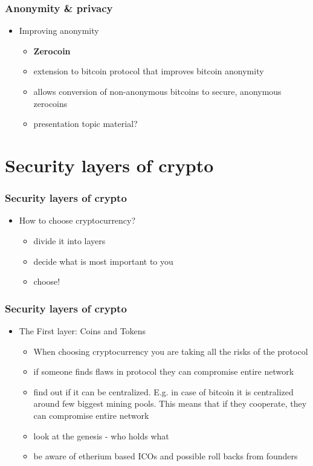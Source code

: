 \documentclass{beamer}
\begin{document}
\begin{frame}
    \frametitle{Anonymity \& privacy}
    \begin{itemize}
        \item<1-> Improving anonymity
        \begin{itemize}
            \item<2-> \textbf{Zerocoin}
            \item<3-> extension to bitcoin protocol that improves bitcoin anonymity
            \item<4-> allows conversion of non-anonymous bitcoins to secure, anonymous zerocoins
            \item<5-> presentation topic material?
        \end{itemize}   
    \end{itemize}
\end{frame}

\section{Security layers of crypto}
\begin{frame}
    \frametitle{Security layers of crypto}
    \begin{itemize}
        \item<1-> How to choose cryptocurrency?
        \begin{itemize}
            \item<2-> divide it into layers
            \item<3-> decide what is most important to you
            \item<4-> choose!
        \end{itemize}   
    \end{itemize}
\end{frame}

\begin{frame}
    \frametitle{Security layers of crypto}
    \begin{itemize}
        \item<1-> The First layer: Coins and Tokens
        \begin{itemize}
            \item<2-> When choosing cryptocurrency you are taking all the risks of the protocol
            \item<3-> if someone finds flaws in protocol they can compromise entire network
            \item<4-> find out if it can be centralized. E.g. in case of bitcoin it is centralized around few biggest mining pools. This means
                that if they cooperate, they can compromise entire network
            \item<5-> look at the genesis - who holds what
            \item<6-> be aware of etherium based ICOs and possible roll backs from founders
        \end{itemize}   
    \end{itemize}
\end{frame}
\end{document}
